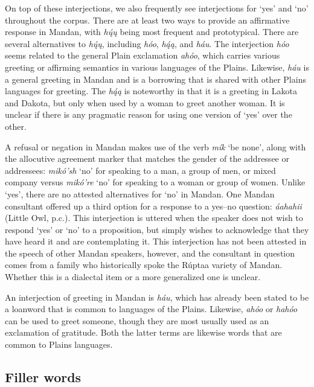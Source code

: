 On top of these interjections, we also frequently see interjections for `yes' and `no' throughout the corpus. There are at least two ways to provide an affirmative response in Mandan, with \textit{hų́ų} being most frequent and prototypical. There are several alternatives to \textit{hų́ų}, including \textit{hóo}, \textit{hą́ą}, and \textit{háu}. The interjection \textit{hóo} seems related to the general Plain exclamation \textit{ahóo}, which carries various greeting or affirming semantics in various languages of the Plains. Likewise, \textit{háu} is a general greeting in Mandan and is a borrowing that is shared with other Plains languages for greeting. The \textit{hą́ą} is noteworthy in that it is a greeting in Lakota and Dakota, but only when used by a woman to greet another woman. It is unclear if there is any pragmatic reason for using one version of `yes' over the other.

A refusal or negation in Mandan makes use of the verb \textit{mík} `be none', along with the allocutive agreement marker that matches the gender of the addressee or addressees: \textit{mikó'sh} `no' for speaking to a man, a group of men, or mixed company versus \textit{mikó're} `no' for speaking to a woman or group of women. Unlike `yes', there are no attested alternatives for `no' in Mandan. One Mandan consultant offered up a third option for a response to a yes--no question: \textit{áahahii} (Little Owl, p.c.). This interjection is uttered when the speaker does not wish to respond `yes' or `no' to a proposition, but simply wishes to acknowledge that they have heard it and are contemplating it. This interjection has not been attested in the speech of other Mandan speakers, however, and the consultant in question comes from a family who historically spoke the {Rúptaa} variety of Mandan. Whether this is a dialectal item or a more generalized one is unclear.

An interjection of greeting in Mandan is \textit{háu}, which has already been stated to be a loanword that is common to languages of the Plains. Likewise, \textit{ahóo} or \textit{hahóo} can be used to greet someone, though they are most usually used as an exclamation of gratitude. Both the latter terms are likewise words that are common to Plains languages.

\subsection{Filler words}\label{Ch6Filler}

